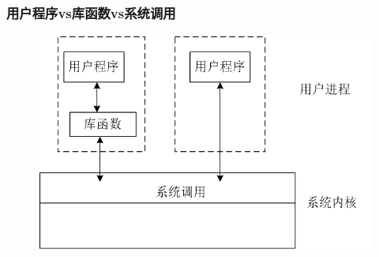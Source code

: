 \documentclass{beamer}
\begin{document}

\begin{frame}
\frametitle{用户程序vs库函数vs系统调用}

\begin{figure}
\includegraphics[width=1\linewidth]{601}
\end{figure}
\end{frame}
\end{document}

